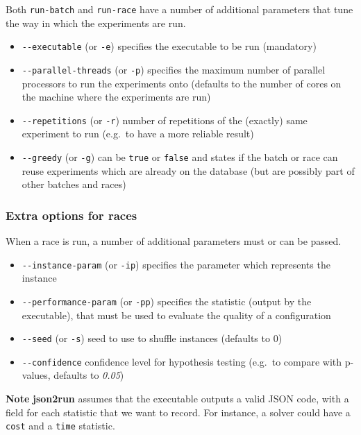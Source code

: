 \documentclass[11pt,notitlepage,twoside,a4paper]{article}
\begin{document}
Both \texttt{run-batch} and \texttt{run-race} have a number of
additional parameters that tune the way in which the experiments are
run.

\begin{itemize}
\item
  \texttt{-{}-executable} (or \texttt{-e}) specifies the executable to
  be run (mandatory)
\item
  \texttt{-{}-parallel-threads} (or \texttt{-p}) specifies the maximum
  number of parallel processors to run the experiments onto (defaults to
  the number of cores on the machine where the experiments are run)
\item
  \texttt{-{}-repetitions} (or \texttt{-r}) number of repetitions of the
  (exactly) same experiment to run (e.g.~to have a more reliable result)
\item
  \texttt{-{}-greedy} (or \texttt{-g}) can be \texttt{true} or
  \texttt{false} and states if the batch or race can reuse experiments
  which are already on the database (but are possibly part of other
  batches and races)
\end{itemize}

\subsubsection{Extra options for races}

When a race is run, a number of additional parameters must or can be
passed.

\begin{itemize}
\item
  \texttt{-{}-instance-param} (or \texttt{-ip}) specifies the parameter
  which represents the instance
\item
  \texttt{-{}-performance-param} (or \texttt{-pp}) specifies the
  statistic (output by the executable), that must be used to evaluate
  the quality of a configuration
\item
  \texttt{-{}-seed} (or \texttt{-s}) seed to use to shuffle instances
  (defaults to 0)
\item
  \texttt{-{}-confidence} confidence level for hypothesis testing
  (e.g.~to compare with p-values, defaults to \emph{0.05})
\end{itemize}

\textbf{Note} \textbf{json2run} assumes that the executable outputs a valid JSON
code, with a field for each statistic that we want to record. For
instance, a solver could have a \texttt{cost} and a \texttt{time}
statistic.
\end{document}
